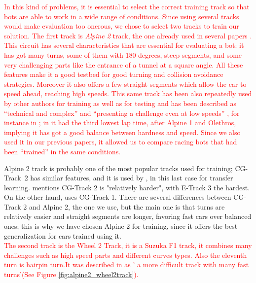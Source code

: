 \documentclass[10pt,journal,compsoc]{IEEEtran}
\begin{document}
\textcolor{red}{
In this kind of problems, it is essential to select the correct
training track so that bots are able to work in a wide range of
conditions. Since using several tracks would make evaluation too onerous, we chose to select two tracks to train our solution.} \textcolor{red}{The first track is \textit{Alpine 2} track, the one already used in several papers  \cite{salem_cig2018,DBLP:conf/cig/SalemMG19}. This circuit has several characteristics that
are essential for evaluating a bot: it has got many turns, some of
them with 180 degrees, steep segments, and some very challenging parts
like the entrance of a tunnel at a square angle. All these features make
it a good testbed for good turning and collision avoidance
strategies. Moreover it also offers a few straight segments which allow the car to speed ahead, reaching high speeds. This same track has been also repeatedly used by other authors for training as well as for testing and has been described as ``technical and complex'' \cite{AG} and ``presenting a challenge even at low speeds'' \cite{vrajitoru2018global}, for instance in
\cite{cardamone2010applying,CarRacing_Pelta09,zong2017obstacle}; in \cite{AG} it had the third lowest lap time, after Alpine 1 and Olethros, implying it
has got a good balance between hardness and speed. Since we also used
it in our previous papers, it allowed us to compare racing bots that
had been ``trained'' in the same conditions.}

Alpine 2 track is probably one of the most popular tracks used for
training; \mbox{CG-Track 2} has similar features, and it is used by
\cite{mirus2019short,8833873,verma2018programmatically},
in this last case for transfer learning. \cite{Kole-ParamCarTunning12}
mentions CG-Track 2 is "relatively harder", with E-Track 3 the
hardest. On the other hand, \cite{10.1371/journal.pone.0213193} uses
CG-Track 1. There are several differences between CG-Track 2 and Alpine
2, the one we use, but the main one is that turns are relatively
easier and straight segments are longer, favoring fast cars over
balanced ones; this is why we have chosen Alpine 2 for training, since
it offers the best generalization for cars trained using it.\\
\textcolor{red}{
The second track is the Wheel 2 Track, it is a  Suzuka F1 track, it combines many challenges such as high speed  parts and different curves types. Also the eleventh turn is hairpin turn.It was  described   in \cite{wheel2track_chen} as ' a more difficult track with many fast turns'(See Figure \ref{fig:alpine2_wheel2track}).}
\end{document}
